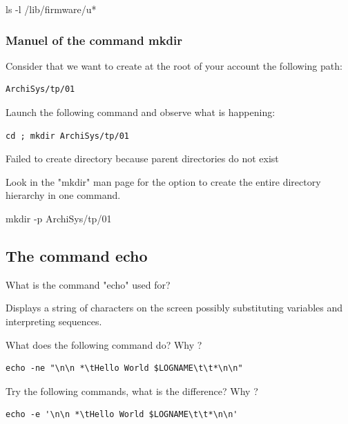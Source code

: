 \documentclass[11pt]{article}
\begin{document}
\begin{solution}
	ls -l /lib/firmware/u*
\end{solution}


\subsubsection{Manuel of the command \textbf{mkdir}}

Consider that we want to create at the root of your account the following path:

\begin{lstlisting}
ArchiSys/tp/01
\end{lstlisting}

\noindent Launch the following command and observe what is happening:

\begin{lstlisting}
cd ; mkdir ArchiSys/tp/01
\end{lstlisting}
\begin{solution}
	Failed to create directory because parent directories do not exist
\end{solution}
\noindent Look in the "mkdir" man page for the option to create the entire directory hierarchy in one command.

\begin{solution}
	mkdir -p ArchiSys/tp/01
\end{solution}

\subsection{The command echo}
\noindent
What is the command "echo" used for?

\begin{solution}
	Displays a string of characters on the screen possibly substituting variables and interpreting sequences.
\end{solution}

\noindent What does the following command do? Why ?


\begin{lstlisting}[alsoletter={*},emph={*}]
echo -ne "\n\n *\tHello World $LOGNAME\t\t*\n\n"
\end{lstlisting}

\noindent Try the following commands, what is the difference? Why ?

\begin{lstlisting}[alsoletter={*},emph={*}]
echo -e '\n\n *\tHello World $LOGNAME\t\t*\n\n'
\end{lstlisting}
\end{document}
